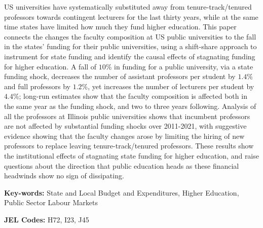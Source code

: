 US universities have systematically substituted away from tenure-track/tenured professors towards contingent lecturers for the last thirty years, while at the same time states have limited how much they fund higher education.
This paper connects the changes the faculty composition at US public universities to the fall in the states' funding for their public universities, using a shift-share approach to instrument for state funding and identify the causal effects of stagnating funding for higher education.
A fall of $10$\% in funding for a public university, via a state funding shock, decreases the number of assistant professors per student by $1.4$\% and full professors by $1.2$\%, yet increases the number of lecturers per student by $4.4$\%; long-run estimates show that the faculty composition is affected both in the same year as the funding shock, and two to three years following.
Analysis of all the professors at Illinois public universities shows that incumbent professors are not affected by substantial funding shocks over 2011-2021, with suggestive evidence showing that the faculty changes arose by limiting the hiring of new professors to replace leaving tenure-track/tenured professors.
These results show the institutional effects of stagnating state funding for higher education, and raise questions about the direction that public education heads as these financial headwinds show no sign of dissipating.

\vfill
\noindent
\textbf{Key-words:}
State and Local Budget and Expenditures,
Higher Education,
Public Sector Labour Markets

\vspace{0.1cm}
\noindent
\textbf{JEL Codes:} H72, I23, J45
